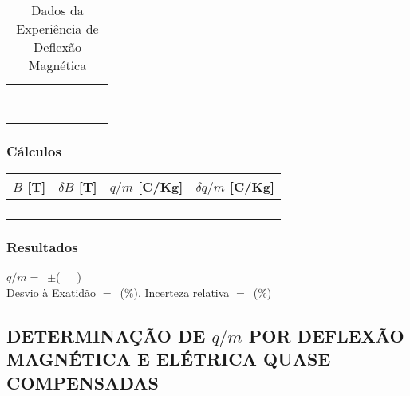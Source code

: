 \documentclass[a4paper,12pt]{article}  %
\begin{document}
\begin{table}[!hbp]
\begin{tabular}{|c|c|c|c|c|c|c|c|}
	 &  &  &  & &  & & \\ \cline{5-6}
	 &  &  &  & &  & & \\ \cline{5-6}
	 \hline
	 &  &  &  & &  & & \\ \cline{5-6}
	 &  &  &  & &  & & \\ \cline{5-6}
	 &  &  &  & &  & & \\ \cline{5-6}
	 \hline
	 &  &  &  & &  & & \\ \cline{5-6}
	 &  &  &  & &  & & \\ \cline{5-6}
	 &  &  &  & &  & & \\ \cline{5-6}
	 \hline
 	\end{tabular}	 	
	\caption{Dados da Experiência de Deflexão Magnética} 
	\label{tab:Dados}
\end{table}

\subsubsection{\sf Cálculos}

\begin{center}
	\begin{tabular}{|c|c|c|c|}
	\hline
	$B$ [T] & $\delta B$  [T] & $q/m$ [C/Kg] & $\delta q/m$ [C/Kg] \\
	\hline
	 &  &  &  \\
	\hline
	 &  &  &  \\
	\hline
	 &  &  &  \\
	\hline
	 &  &  &  \\
	 \hline
 	\end{tabular}
\end{center}


\subsubsection{\sf Resultados}
\noindent  $q/m =$~\underline{\makebox[1.5cm][r]{~}}$\pm$\underline{\makebox[1cm][r]{~}}(~~~)\\  

\noindent  Desvio à Exatidão $=$~\underline{\makebox[1cm][r]{~}}(\%), 
Incerteza relativa $=$~\underline{\makebox[1cm][r]{~}}($\%$) 

\subsection{\sf DETERMINAÇÃO DE $q/m$ POR DEFLEXÃO\\ MAGNÉTICA E ELÉTRICA QUASE COMPENSADAS }
\end{document}
